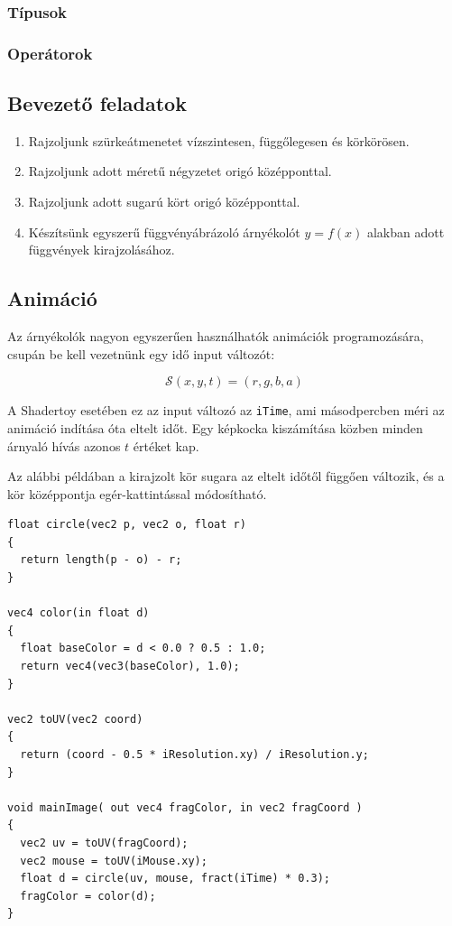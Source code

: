 \subsubsection{Típusok}

\subsubsection{Operátorok}

\subsection{Bevezető feladatok}

\begin{enumerate}
  \item Rajzoljunk szürkeátmenetet vízszintesen, függőlegesen és körkörösen.
  \item Rajzoljunk adott méretű négyzetet origó középponttal.
  \item Rajzoljunk adott sugarú kört origó középponttal.
  \item Készítsünk egyszerű függvényábrázoló árnyékolót $y = f(x)$ alakban adott függvények kirajzolásához.
\end{enumerate}

\subsection{Animáció}

Az árnyékolók nagyon egyszerűen használhatók animációk programozására, csupán
be kell vezetnünk egy idő input változót:

$$\mathcal{S}(x, y, t) = (r, g, b, a)$$

A Shadertoy esetében ez az input változó az \texttt{iTime}, ami másodpercben méri az animáció indítása
óta eltelt időt. Egy képkocka kiszámítása közben minden árnyaló hívás azonos $t$ értéket kap.

Az alábbi példában a kirajzolt kör sugara az eltelt időtől függően változik, és a kör középpontja
egér-kattintással módosítható.

\begin{tcolorbox}[colback=yellow!5,colframe=yellow!50!black,title=Változó sugarú és középpontú kör]
\begin{verbatim}
float circle(vec2 p, vec2 o, float r)
{
  return length(p - o) - r;
}
    
vec4 color(in float d)
{
  float baseColor = d < 0.0 ? 0.5 : 1.0;
  return vec4(vec3(baseColor), 1.0);
}
    
vec2 toUV(vec2 coord)
{
  return (coord - 0.5 * iResolution.xy) / iResolution.y;
}
    
void mainImage( out vec4 fragColor, in vec2 fragCoord )
{
  vec2 uv = toUV(fragCoord);
  vec2 mouse = toUV(iMouse.xy);
  float d = circle(uv, mouse, fract(iTime) * 0.3);
  fragColor = color(d);    
}
\end{verbatim}  
\end{tcolorbox}

